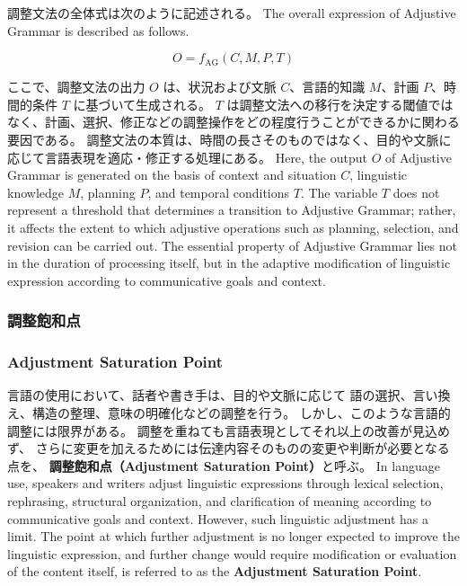 \documentclass[a4paper]{article}
\begin{document}
\ifJPN
調整文法の全体式は次のように記述される。
\else
The overall expression of Adjustive Grammar is described as follows.
\fi

\[
O = f_{\text{AG}}(C, M, P, T)
\]

\ifJPN
ここで、調整文法の出力 \( O \) は、状況および文脈 \( C \)、言語的知識 \( M \)、計画 \( P \)、時間的条件 \( T \) に基づいて生成される。
\( T \) は調整文法への移行を決定する閾値ではなく、計画、選択、修正などの調整操作をどの程度行うことができるかに関わる要因である。
調整文法の本質は、時間の長さそのものではなく、目的や文脈に応じて言語表現を適応・修正する処理にある。
\else
Here, the output \( O \) of Adjustive Grammar is generated on the basis of context and situation \( C \), linguistic knowledge \( M \), planning \( P \), and temporal conditions \( T \).
The variable \( T \) does not represent a threshold that determines a transition to Adjustive Grammar; rather, it affects the extent to which adjustive operations such as planning, selection, and revision can be carried out.
The essential property of Adjustive Grammar lies not in the duration of processing itself, but in the adaptive modification of linguistic expression according to communicative goals and context.
\fi

\ifJPN
\subsubsection{調整飽和点}
\else
\subsubsection{Adjustment Saturation Point}
\fi

\ifJPN
言語の使用において、話者や書き手は、目的や文脈に応じて
語の選択、言い換え、構造の整理、意味の明確化などの調整を行う。
しかし、このような言語的調整には限界がある。
調整を重ねても言語表現としてそれ以上の改善が見込めず、
さらに変更を加えるためには伝達内容そのものの変更や判断が必要となる点を、
\textbf{調整飽和点（Adjustment Saturation Point）}と呼ぶ。
\else
In language use, speakers and writers adjust linguistic expressions
through lexical selection, rephrasing, structural organization,
and clarification of meaning according to communicative goals and context.
However, such linguistic adjustment has a limit.
The point at which further adjustment is no longer expected to improve
the linguistic expression, and further change would require modification
or evaluation of the content itself, is referred to as the
\textbf{Adjustment Saturation Point}.
\fi
\end{document}
